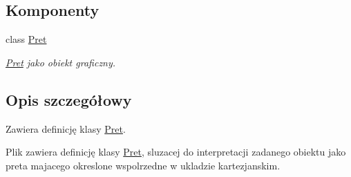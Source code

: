 \subsection*{Komponenty}
\begin{DoxyCompactItemize}
\item 
class \hyperlink{classPret}{Pret}
\begin{DoxyCompactList}\small\item\em \hyperlink{classPret}{Pret} jako obiekt graficzny. \end{DoxyCompactList}\end{DoxyCompactItemize}


\subsection{Opis szczegółowy}
Zawiera definicję klasy \hyperlink{classPret}{Pret}. 

Plik zawiera definicję klasy \hyperlink{classPret}{Pret}, sluzacej do interpretacji zadanego obiektu jako preta majacego okreslone wspolrzedne w ukladzie kartezjanskim. 